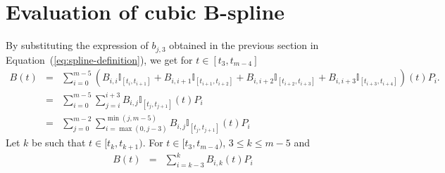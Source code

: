 \documentclass {article}
\begin{document}
\section {Evaluation of cubic B-spline}

By substituting the expression of $b_{j,3}$ obtained in the previous section in Equation~(\ref{eq:spline-definition}), we get for $t\in [t_3,t_{m-4}]$
\begin{eqnarray*}
B(t) &=& \sum_{i=0}^{m-5} (B_{i, i} \mathbb{I}_{[t_i, t_{i+1}]} + B_{i,i+1} \mathbb{I}_{[t_{i+1}, t_{i+2}]} +B_{i,i+2} \mathbb{I}_{[t_{i+2}, t_{i+3}]}+B_{i,i+3} \mathbb{I}_{[t_{i+3}, t_{i+4}]})(t) P_i.\\
&=& \sum_{i=0}^{m-5} \sum_{j=i}^{i+3} B_{i, j} \mathbb{I}_{[t_{j}, t_{j+1}]} (t) P_i\\
&=& \sum_{j=0}^{m-2} \sum_{i=\max(0,j-3)}^{\min(j,m-5)} B_{i, j} \mathbb{I}_{[t_{j}, t_{j+1}]} (t) P_i
\end{eqnarray*}
Let $k$ be such that $t\in[t_{k},t_{k+1})$. For $t\in[t_3,t_{m-4})$, $3\leq k \leq m-5$ and
\begin{eqnarray}\label{eq:spline-evaluation}
B(t) &=& \sum_{i=k-3}^{k} B_{i, k}(t)  P_i
\end{eqnarray}
\end{document}
